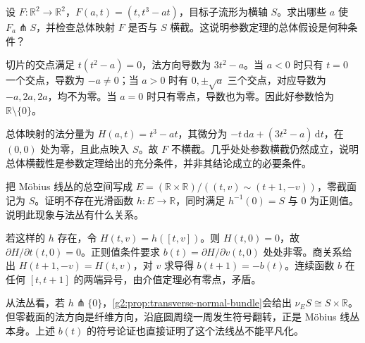 \begin{exercise}\label{g2:ex:parametric-sufficient-not-necessary}
	设 \(F:\mathbb R^2\to\mathbb R^2\)，\(F(a,t)=(t,t^3-at)\)，目标子流形为横轴 \(S\)。求出哪些 \(a\) 使 \(F_a\pitchfork S\)，并检查总体映射 \(F\) 是否与 \(S\) 横截。这说明参数定理的总体假设是何种条件？
\end{exercise}
\begin{solution}
	切片的交点满足 \(t(t^2-a)=0\)，法方向导数为 \(3t^2-a\)。当 \(a<0\) 时只有 \(t=0\) 一个交点，导数为 \(-a\ne0\)；当 \(a>0\) 时有 \(0,\pm\sqrt a\) 三个交点，对应导数为 \(-a,2a,2a\)，均不为零。当 \(a=0\) 时只有零点，导数也为零。因此好参数恰为 \(\mathbb R\setminus\{0\}\)。

	总体映射的法分量为 \(H(a,t)=t^3-at\)，其微分为 \(-t\,\mathrm{d}a+(3t^2-a)\,\mathrm{d}t\)，在 \((0,0)\) 处为零，且此点映入 \(S\)。故 \(F\) 不横截。几乎处处参数横截仍然成立，说明总体横截性是参数定理给出的充分条件，并非其结论成立的必要条件。
\end{solution}

\begin{exercise}\label{g2:ex:mobius-regular-zero}
	把 Möbius 线丛的总空间写成 \(E=(\mathbb R\times\mathbb R)/((t,v)\sim(t+1,-v))\)，零截面记为 \(S\)。证明不存在光滑函数 \(h:E\to\mathbb R\)，同时满足 \(h^{-1}(0)=S\) 与 \(0\) 为正则值。说明此现象与法丛有什么关系。
\end{exercise}
\begin{solution}
	若这样的 \(h\) 存在，令 \(H(t,v)=h([t,v])\)。则 \(H(t,0)=0\)，故 \(\partial H/\partial t(t,0)=0\)。正则值条件要求 \(b(t)=\partial H/\partial v(t,0)\) 处处非零。商关系给出 \(H(t+1,-v)=H(t,v)\)，对 \(v\) 求导得 \(b(t+1)=-b(t)\)。连续函数 \(b\) 在任何 \([t,t+1]\) 的两端异号，由介值定理必有零点，矛盾。

	从法丛看，若 \(h\pitchfork\{0\}\)，\cref{g2:prop:transverse-normal-bundle}会给出 \(\nu_E S\cong S\times\mathbb R\)。但零截面的法方向是纤维方向，沿底圆周绕一周发生符号翻转，正是 Möbius 线丛本身。上述 \(b(t)\) 的符号论证也直接证明了这个法线丛不能平凡化。
\end{solution}

